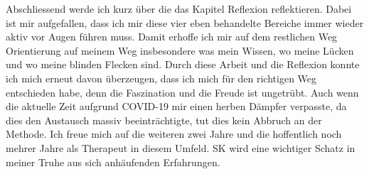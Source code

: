 Abschliessend werde ich kurz über die das Kapitel Reflexion reflektieren. Dabei ist mir aufgefallen, dass ich mir diese vier eben behandelte Bereiche immer wieder aktiv vor Augen führen muss. Damit erhoffe ich mir auf dem restlichen Weg Orientierung auf meinem Weg insbesondere was mein Wissen, wo meine Lücken und wo meine blinden Flecken sind. Durch diese Arbeit und die Reflexion konnte ich mich erneut davon überzeugen, dass ich mich für den richtigen Weg entschieden habe, denn die Faszination und die Freude ist ungetrübt. Auch wenn die aktuelle Zeit aufgrund COVID-19 mir einen herben Dämpfer verpasste, da dies den Austausch massiv beeinträchtigte, tut dies kein Abbruch an der Methode. Ich freue mich auf die weiteren zwei Jahre und die hoffentlich noch mehrer Jahre als Therapeut in diesem Umfeld. SK wird eine wichtiger Schatz in meiner Truhe aus sich anhäufenden Erfahrungen.

